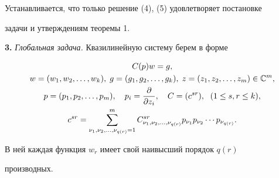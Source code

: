 Устанавливается, что только решение (4), (5) удовлетворяет постановке


задачи и утверждениям теоремы 1.


\medskip





{\bf 3.} {\it Глобальная задача.} Квазилинейную систему берем в форме


\begin{gather}


C(p)w=g,\\


w=(w_1,w_2,\dotsc,w_k),\; g=(g_1,g_2,\dotsc,g_k),\;


z=(z_1,z_2,\dotsc,z_m)\in\Bbb C^m,\notag \\


p=(p_1,p_2,\dotsc,p_m),\quad


p_i=\frac{\partial}{\partial z_i},\quad C=(c^{sr}), \ \;


(1\le s,r\le k),\notag\\


c^{sr}=\sum^m_{\nu_1,\nu_2,\dotsc,\nu_{q(r)}=1}


C^{sr}_{\nu_1,\nu_2,\dotsc,\nu_{q(r)}}


p_{\nu_1}p_{\nu_2}\dotsb p_{\nu_{q(r)}}.\notag


\end{gather}


В ней каждая функция $w_r$ имеет свой наивысший порядок $q(r)$


производных.






